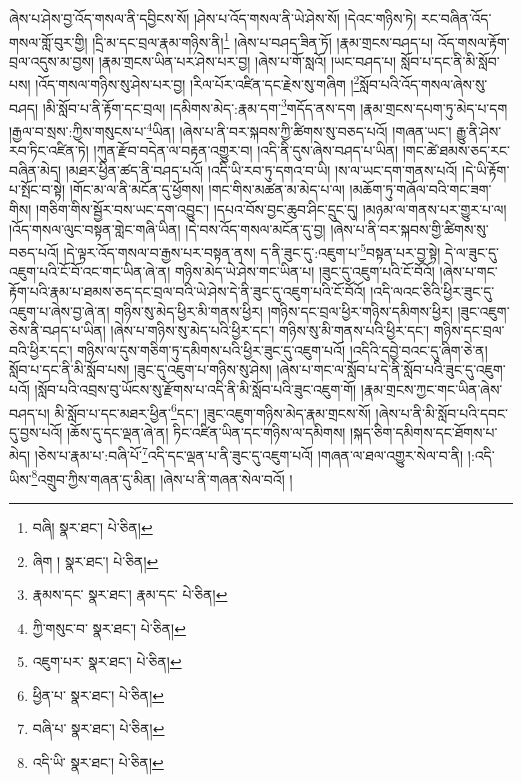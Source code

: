 ཞེས་པ་ཤེས་བྱ་འོད་གསལ་ནི་དབྱིངས་སོ། །ཤེས་པ་འོད་གསལ་ནི་ཡེ་ཤེས་སོ། །དེའང་གཉིས་ཏེ། རང་བཞིན་འོད་གསལ་གློ་བུར་གྱི། །དྲི་མ་དང་བྲལ་རྣམ་གཉིས་ནི།\footnote{བཞི།  སྣར་ཐང་།  པེ་ཅིན། } །ཞེས་པ་བཤད་ཟིན་ཏོ། །རྣམ་གྲངས་བཤད་པ། འོད་གསལ་རྟོག་བྲལ་འདུས་མ་བྱས། །རྣམ་གྲངས་ཡིན་པར་ཤེས་པར་བྱ། །ཞེས་པ་གོ་སླའོ། །ཡང་བཤད་པ། སློབ་པ་དང་ནི་མི་སློབ་པས། །འོད་གསལ་གཉིས་སུ་ཤེས་པར་བྱ། །རིལ་པོར་འཛིན་དང་རྗེས་སུ་གཞིག །\footnote{ཞིག །  སྣར་ཐང་།  པེ་ཅིན། }སློབ་པའི་འོད་གསལ་ཞེས་སུ་བཤད། །མི་སློབ་པ་ནི་རྟོག་དང་བྲལ། །དམིགས་མེད་:རྣམ་དག་\footnote{རྣམས་དང་  སྣར་ཐང་། རྣམ་དང་  པེ་ཅིན། }གདོད་ནས་དག །རྣམ་གྲངས་དཔག་ཏུ་མེད་པ་དག །རྒྱལ་བ་སྲས་:ཀྱིས་གསུངས་པ་\footnote{ཀྱི་གསུང་བ་  སྣར་ཐང་།  པེ་ཅིན། }ཡིན། །ཞེས་པ་ནི་བར་སྐབས་ཀྱི་ཚིགས་སུ་བཅད་པའོ། །གཞན་ཡང་། རྒྱུ་ནི་ཤེས་རབ་ཏིང་འཛིན་ཏེ། །ཀུན་རྫོབ་བདེན་ལ་བརྟན་འགྱུར་བ། །འདི་ནི་དུས་ཞེས་བཤད་པ་ཡིན། །གང་ཚེ་ཐམས་ཅད་རང་བཞིན་མེད། །མཐར་ཕྱིན་ཚད་ནི་བཤད་པའོ། །འདི་ཡི་རབ་ཏུ་དགའ་བ་ཡི། །ས་ལ་ཡང་དག་གནས་པའོ། །དེ་ཡི་རྟོག་པ་སྤོང་བ་སྟེ། །གོང་མ་ལ་ནི་མངོན་དུ་ཕྱོགས། །གང་གིས་མཚན་མ་མེད་པ་ལ། །མཆོག་ཏུ་གཞོལ་བའི་གང་ཟག་གིས། །གཅིག་གིས་སྦྱོར་བས་ཡང་དག་འབྱུང་། །དཔའ་བོས་བྱང་ཆུབ་ཤིང་དྲུང་དུ། །མཉམ་ལ་གནས་པར་གྱུར་པ་ལ། །འོད་གསལ་ལུང་བསྟན་གླེང་གཞི་ཡིན། །དེ་བས་འོད་གསལ་མངོན་དུ་བྱ། །ཞེས་པ་ནི་བར་སྐབས་གྱི་ཚིགས་སུ་བཅད་པའོ། །དེ་ལྟར་འོད་གསལ་བ་རྒྱས་པར་བསྟན་ནས། ད་ནི་ཟུང་དུ་:འཇུག་པ་\footnote{འཇུག་པར་  སྣར་ཐང་།  པེ་ཅིན། }བསྟན་པར་བྱ་སྟེ། དེ་ལ་ཟུང་དུ་འཇུག་པའི་ངོ་བོ་འང་གང་ཡིན་ཞེ་ན། གཉིས་མེད་ཡེ་ཤེས་གང་ཡིན་པ། །ཟུང་དུ་འཇུག་པའི་ངོ་བོའོ། །ཞེས་པ་གང་རྟོག་པའི་རྣམ་པ་ཐམས་ཅད་དང་བྲལ་བའི་ཡེ་ཤེས་དེ་ནི་ཟུང་དུ་འཇུག་པའི་ངོ་བོའོ། །འདི་ལའང་ཅིའི་ཕྱིར་ཟུང་དུ་འཇུག་པ་ཞེས་བྱ་ཞེ་ན། གཉིས་སུ་མེད་ཕྱིར་མི་གནས་ཕྱིར། །གཉིས་དང་བྲལ་ཕྱིར་གཉིས་དམིགས་ཕྱིར། །ཟུང་འཇུག་ཅེས་ནི་བཤད་པ་ཡིན། །ཞེས་པ་གཉིས་སུ་མེད་པའི་ཕྱིར་དང་། གཉིས་སུ་མི་གནས་པའི་ཕྱིར་དང་། གཉིས་དང་བྲལ་བའི་ཕྱིར་དང་། གཉིས་ལ་དུས་གཅིག་ཏུ་དམིགས་པའི་ཕྱིར་ཟུང་དུ་འཇུག་པའོ། །འདིའི་དབྱེ་བའང་དུ་ཞིག་ཅེ་ན། སློབ་པ་དང་ནི་མི་སློབ་པས། །ཟུང་དུ་འཇུག་པ་གཉིས་སུ་ཤེས། །ཞེས་པ་གང་ལ་སློབ་པ་དེ་ནི་སློབ་པའི་ཟུང་དུ་འཇུག་པའོ། །སློབ་པའི་འབྲས་བུ་ཡོངས་སུ་རྫོགས་པ་འདི་ནི་མི་སློབ་པའི་ཟུང་འཇུག་གོ། །རྣམ་གྲངས་ཀྱང་གང་ཡིན་ཞེས་བཤད་པ། མི་སློབ་པ་དང་མཐར་ཕྱིན་\footnote{ཕྱིན་པ་  སྣར་ཐང་།  པེ་ཅིན། }དང་། །ཟུང་འཇུག་གཉིས་མེད་རྣམ་གྲངས་སོ། །ཞེས་པ་ནི་མི་སློབ་པའི་དབང་དུ་བྱས་པའོ། །ཆོས་དུ་དང་ལྡན་ཞེ་ན། ཏིང་འཛིན་ཡིན་དང་གཉིས་ལ་དམིགས། །སྐད་ཅིག་དམིགས་དང་ཐོགས་པ་མེད། །ཅེས་པ་རྣམ་པ་:བཞི་པོ་\footnote{བཞི་པ་  སྣར་ཐང་།  པེ་ཅིན། }འདི་དང་ལྡན་པ་ནི་ཟུང་དུ་འཇུག་པའོ། །གཞན་ལ་ཐལ་འགྱུར་སེལ་བ་ནི། །:འདི་ཡིས་\footnote{འདི་ཡི་  སྣར་ཐང་།  པེ་ཅིན། }འགྲུབ་ཀྱིས་གཞན་དུ་མིན། །ཞེས་པ་ནི་གཞན་སེལ་བའོ། །
